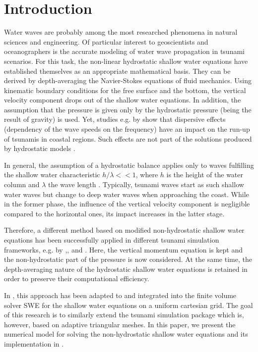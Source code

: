 
\section{Introduction}

Water waves are probably among the most researched phenomena in natural sciences and engineering. Of particular interest to geoscientists and oceanographers is the accurate modeling of water wave propagation in tsunami scenarios. For this task, the non-linear hydrostatic shallow water equations have established themselves as an appropriate mathematical basis. They can be derived by depth-averaging the Navier-Stokes equations of fluid mechanics. Using kinematic boundary conditions for the free surface and the bottom, the vertical velocity component drops out of the shallow water equations. In addition, the assumption that the pressure is given only by the hydrostatic pressure (being the result of gravity) is used. Yet, studies e.g. by \cite{horrillo} show that dispersive effects (dependency of the wave speeds on the frequency) have an impact on the run-up of tsunamis in coastal regions. Such effects are not part of the solutions produced by hydrostatic models \cite{horrillo}. 

In general, the assumption of a hydrostatic balance applies only to waves fulfilling the shallow water characteristic $h/\lambda <<1$, where $h$ is the height of the water column and $\lambda$ the wave length \cite{fuchs}. Typically, tsunami waves start as such shallow water waves but change to deep water waves when approaching the coast. While in the former phase, the influence of the vertical velocity component is negligible compared to the horizontal ones, its impact increases in the latter stage.

Therefore, a different method based on modified non-hydrostatic shallow water equations has been successfully applied in different tsunami simulation frameworks, e.g. by \cite{fuchs},\cite{cui},\cite{walters} and \cite{stelling2003accurate}. Here, the vertical momentum equation is kept and the non-hydrostatic part of the pressure is now considered. At the same time, the depth-averaging nature of the hydrostatic shallow water equations is retained in order to preserve their computational efficiency. 

In \cite{samfass14extension}, this approach has been adapted to and integrated into the finite volume solver SWE for the shallow water equations on a uniform cartesian grid. The goal of this research is to similarly extend the tsunami simulation package \samoa which is, however, based on adaptive triangular meshes. In this paper, we present the numerical model for solving the non-hydrostatic shallow water equations and its implementation in \samoa.


